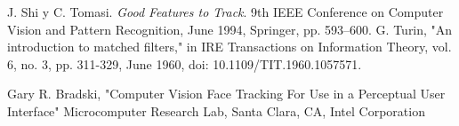 \begin{thebibliography}{9}
J. Shi y C. Tomasi. \textit{Good Features to Track}. 9th IEEE Conference on Computer Vision and Pattern Recognition, June 1994, Springer, pp. 593–600.
 G. Turin, "An introduction to matched filters," in IRE Transactions on Information Theory, vol. 6, no. 3, pp. 311-329, June 1960, doi: 10.1109/TIT.1960.1057571.
 
 Gary R. Bradski, "Computer Vision Face Tracking For Use in a Perceptual User
 Interface" Microcomputer Research Lab, Santa Clara, CA, Intel Corporation


\end{thebibliography}

